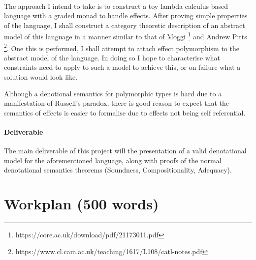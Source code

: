 \documentclass[11pt]{article}
\begin{document}
\paragraph{}{
The approach I intend to take is to construct a toy lambda calculus based language with a graded monad to handle effects. After proving simple properties of the language, I shall construct a category theoretic description of an abstract model of this language in a manner similar to that of Moggi \footnote{https://core.ac.uk/download/pdf/21173011.pdf} and Andrew Pitts \footnote{  https://www.cl.cam.ac.uk/teaching/1617/L108/catl-notes.pdf}. One this is performed, I shall attempt to attach effect polymorphism to the abstract model of the language. In doing so I hope to characterise what constraints need to apply to such a model to achieve this, or on failure what a solution would look like.

Although a denotional semantics for polymorphic types is hard due to a manifestation of Russell's paradox, there is good reason to expect that the semantics of effects is easier to formalise due to effects not being self referential.
}

\paragraph{Deliverable}{
The main deliverable of this project will the presentation of a valid denotational model for the aforementioned language, along with proofs of the normal denotational semantics theorems (Soundness, Compositionality, Adequacy).
}



\section{Workplan (500 words)}
\end{document}
